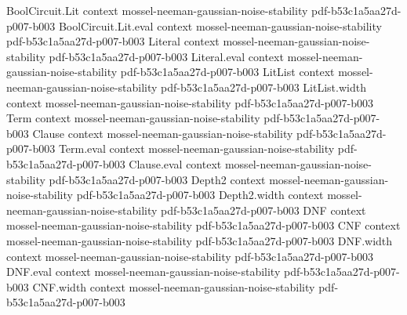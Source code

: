 \begin{theorem}
\label{BooleanAnalysis.GaussianSpace.MaxCut.gaussianRounding_ratio}
\leanok
{}
\proofstep
  {BoolCircuit.Lit}
  {context}
  {mossel-neeman-gaussian-noise-stability}
  {pdf-b53c1a5aa27d-p007-b003}
\proofstep
  {BoolCircuit.Lit.eval}
  {context}
  {mossel-neeman-gaussian-noise-stability}
  {pdf-b53c1a5aa27d-p007-b003}
\proofstep
  {Literal}
  {context}
  {mossel-neeman-gaussian-noise-stability}
  {pdf-b53c1a5aa27d-p007-b003}
\proofstep
  {Literal.eval}
  {context}
  {mossel-neeman-gaussian-noise-stability}
  {pdf-b53c1a5aa27d-p007-b003}
\proofstep
  {LitList}
  {context}
  {mossel-neeman-gaussian-noise-stability}
  {pdf-b53c1a5aa27d-p007-b003}
\proofstep
  {LitList.width}
  {context}
  {mossel-neeman-gaussian-noise-stability}
  {pdf-b53c1a5aa27d-p007-b003}
\proofstep
  {Term}
  {context}
  {mossel-neeman-gaussian-noise-stability}
  {pdf-b53c1a5aa27d-p007-b003}
\proofstep
  {Clause}
  {context}
  {mossel-neeman-gaussian-noise-stability}
  {pdf-b53c1a5aa27d-p007-b003}
\proofstep
  {Term.eval}
  {context}
  {mossel-neeman-gaussian-noise-stability}
  {pdf-b53c1a5aa27d-p007-b003}
\proofstep
  {Clause.eval}
  {context}
  {mossel-neeman-gaussian-noise-stability}
  {pdf-b53c1a5aa27d-p007-b003}
\proofstep
  {Depth2}
  {context}
  {mossel-neeman-gaussian-noise-stability}
  {pdf-b53c1a5aa27d-p007-b003}
\proofstep
  {Depth2.width}
  {context}
  {mossel-neeman-gaussian-noise-stability}
  {pdf-b53c1a5aa27d-p007-b003}
\proofstep
  {DNF}
  {context}
  {mossel-neeman-gaussian-noise-stability}
  {pdf-b53c1a5aa27d-p007-b003}
\proofstep
  {CNF}
  {context}
  {mossel-neeman-gaussian-noise-stability}
  {pdf-b53c1a5aa27d-p007-b003}
\proofstep
  {DNF.width}
  {context}
  {mossel-neeman-gaussian-noise-stability}
  {pdf-b53c1a5aa27d-p007-b003}
\proofstep
  {DNF.eval}
  {context}
  {mossel-neeman-gaussian-noise-stability}
  {pdf-b53c1a5aa27d-p007-b003}
\proofstep
  {CNF.width}
  {context}
  {mossel-neeman-gaussian-noise-stability}
  {pdf-b53c1a5aa27d-p007-b003}

\end{theorem}
